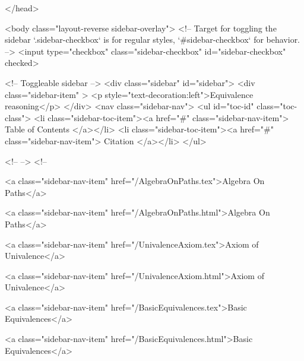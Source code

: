   
</head>




  <body class="layout-reverse sidebar-overlay">
    <!-- Target for toggling the sidebar `.sidebar-checkbox` is for regular
     styles, `#sidebar-checkbox` for behavior. -->
<input type="checkbox" class="sidebar-checkbox" id="sidebar-checkbox" checked>

<!-- Toggleable sidebar -->
<div class="sidebar" id="sidebar">
  <div class="sidebar-item" >
    <p style="text-decoration:left">Equivalence reasoning</p>
  </div>
  <nav class="sidebar-nav">
    <ul id="toc-id" class="toc-class">
  <li class="sidebar-toc-item"><a href="#" class="sidebar-nav-item"> Table of Contents </a></li>
  <li class="sidebar-toc-item"><a href="#" class="sidebar-nav-item"> Citation </a></li>
</ul>


    <!--  -->
    <!-- 
      
    
      
    
      
    
      
    
      
        
      
    
      
        
          <a class="sidebar-nav-item" href="/AlgebraOnPaths.tex">Algebra On Paths</a>
        
      
    
      
        
          <a class="sidebar-nav-item" href="/AlgebraOnPaths.html">Algebra On Paths</a>
        
      
    
      
        
          <a class="sidebar-nav-item" href="/UnivalenceAxiom.tex">Axiom of Univalence</a>
        
      
    
      
        
          <a class="sidebar-nav-item" href="/UnivalenceAxiom.html">Axiom of Univalence</a>
        
      
    
      
        
          <a class="sidebar-nav-item" href="/BasicEquivalences.tex">Basic Equivalences</a>
        
      
    
      
        
          <a class="sidebar-nav-item" href="/BasicEquivalences.html">Basic Equivalences</a>
        
